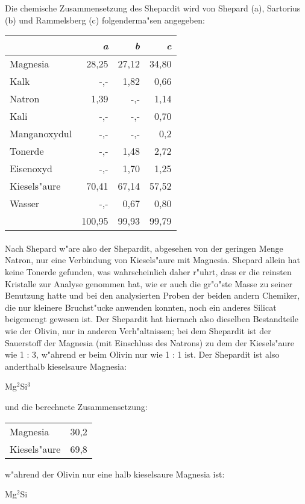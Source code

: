 \documentclass[a4paper, 11pt, oneside]{article}
\begin{document}
Die chemische Zusammensetzung des Shepardit wird von Shepard (a), Sartorius (b) und Rammelsberg (c) folgenderma"sen angegeben:
\begin{center}
\begin{tabular}{ |l|r|r|r| }
    \hline
     & \emph{a} & \emph{b} & \emph{c}\\
    \hline\hline
    Magnesia & 28,25 & 27,12 & 34,80\\\hline
    Kalk & -,- & 1,82 & 0,66\\\hline
    Natron & 1,39 & -,- & 1,14\\\hline
    Kali & -,- & -,- & 0,70\\\hline
    Manganoxydul & -,- & -,- & 0,2\\\hline
    Tonerde & -,- & 1,48 & 2,72\\\hline
    Eisenoxyd & -,- & 1,70 & 1,25\\\hline
    Kiesels"aure & 70,41 & 67,14 & 57,52\\\hline
    Wasser & -,- & 0,67 & 0,80\\\hline
     & 100,95 & 99,93 & 99,79\\
    \hline
\end{tabular}
\end{center}
\paragraph{}
Nach Shepard w"are also der Shepardit, abgesehen von der geringen Menge Natron, nur eine Verbindung von Kiesels"aure mit Magnesia. Shepard allein hat keine Tonerde gefunden, was wahrscheinlich daher r"uhrt, dass er die reinsten Kristalle zur Analyse genommen hat, wie er auch die gr"o"ste Masse zu seiner Benutzung hatte und bei den analysierten Proben der beiden andern Chemiker, die nur kleinere Bruchst"ucke anwenden konnten, noch ein anderes Silicat beigemengt gewesen ist. Der Shepardit hat hiernach also dieselben Bestandteile wie der Olivin, nur in anderen Verh"altnissen; bei dem Shepardit ist der Sauerstoff der Magnesia (mit Einschluss des Natrons) zu dem der Kiesels"aure wie 1 : 3, w"ahrend er beim Olivin nur wie 1 : 1 ist. Der Shepardit ist also anderthalb kieselsaure Magnesia:
\begin{center}
Mg$^{2}$Si$^{3}$
\end{center}
und die berechnete Zusammensetzung:
\begin{center}
\begin{tabular}{ l r }
    Magnesia & 30,2\\
    Kiesels"aure & 69,8\\
\end{tabular}
\end{center}
w"ahrend der Olivin nur eine halb kieselsaure Magnesia ist:
\begin{center}
Mg$^{2}$Si
\end{center}
\end{document}
